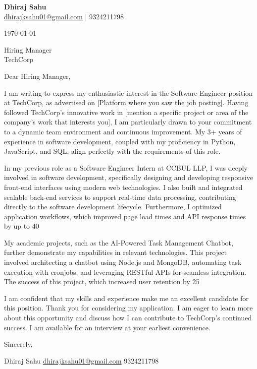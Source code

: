 \documentclass[letterpaper, 11pt]{article}
\begin{document}
\RaggedRight

\textbf{Dhiraj Sahu} \\
\href{mailto:dhirajksahu01@gmail.com}{dhirajksahu01@gmail.com} | 9324211798 \\

\bigskip

\today

\bigskip

Hiring Manager \\
TechCorp \\
[Address Redacted for Privacy]

\bigskip

Dear Hiring Manager,

I am writing to express my enthusiastic interest in the Software Engineer position at TechCorp, as advertised on [Platform where you saw the job posting]. Having followed TechCorp's innovative work in [mention a specific project or area of the company's work that interests you], I am particularly drawn to your commitment to a dynamic team environment and continuous improvement. My 3+ years of experience in software development, coupled with my proficiency in Python, JavaScript, and SQL, align perfectly with the requirements of this role.

In my previous role as a Software Engineer Intern at CCBUL LLP, I was deeply involved in software development, specifically designing and developing responsive front-end interfaces using modern web technologies. I also built and integrated scalable back-end services to support real-time data processing, contributing directly to the software development lifecycle. Furthermore, I optimized application workflows, which improved page load times and API response times by up to 40%

My academic projects, such as the AI-Powered Task Management Chatbot, further demonstrate my capabilities in relevant technologies. This project involved architecting a chatbot using Node.js and MongoDB, automating task execution with cronjobs, and leveraging RESTful APIs for seamless integration. The success of this project, which increased user retention by 25%

I am confident that my skills and experience make me an excellent candidate for this position. Thank you for considering my application. I am eager to learn more about this opportunity and discuss how I can contribute to TechCorp's continued success. I am available for an interview at your earliest convenience.

\bigskip

Sincerely,

Dhiraj Sahu
\href{mailto:dhirajksahu01@gmail.com}{dhirajksahu01@gmail.com}
9324211798
\end{document}
